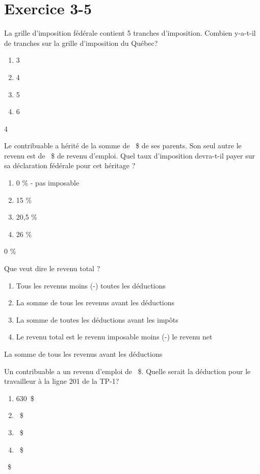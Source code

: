 \section{Exercice 3-5}
\setcounter{question}{0}
\begin{question}
	La grille d'imposition fédérale contient 5 tranches d'imposition. Combien y-a-t-il de tranches sur la grille d'imposition du Québec?
	\begin{enumerate}[label=\Alph*.]
		\item 3
		\item 4
		\item 5
		\item 6
	\end{enumerate}
\end{question}
4

\begin{question}
	Le contribuable a hérité de la somme de ~\$ de ses parents. Son seul autre le revenu est de ~\$ de revenu d’emploi. Quel taux d’imposition devra-t-il payer sur sa déclaration fédérale pour cet héritage ?
	\begin{enumerate}[label=\Alph*.]
		\item 0 \% - pas imposable
		\item 15 \%
		\item 20,5 \%
		\item 26 \%
	\end{enumerate}
\end{question}
0 \%

\begin{question}
	Que veut dire le \og revenu total \fg{}?
	\begin{enumerate}[label=\Alph*.]
		\item Tous les revenus moins (-)  toutes les déductions
		\item La somme de tous les revenus avant les déductions
		\item La somme de toutes les déductions avant les impôts
		\item Le revenu total est le revenu imposable moins (-) le revenu net
	\end{enumerate}
\end{question}
La somme de tous les revenus avant les déductions

\begin{question}
	Un contribuable a un revenu d'emploi de ~\$. Quelle serait la déduction pour le travailleur à la ligne 201 de la TP-1?
	\begin{enumerate}[label=\Alph*.]
		\item 630~\$
		\item {}~\$
		\item {}~\$
		\item {}~\$
	\end{enumerate}
\end{question}
~\$

